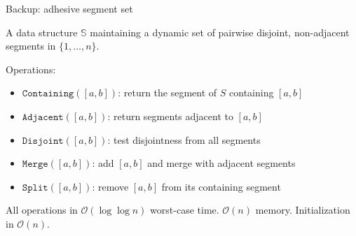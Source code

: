 \documentclass[aspectratio=169,11pt]{beamer}
\newcommand{\Oh}{\mathcal{O}}
\begin{document}

\appendix

\begin{frame}{Backup: adhesive segment set}

{\small A data structure $\mathbb{S}$ maintaining a dynamic set of pairwise disjoint, non-adjacent segments in $\{1,\ldots,n\}$.}

\medskip
Operations:
\begin{itemize}
\item $\mathtt{Containing}([a,b])$: return the segment of $S$ containing $[a,b]$
\item $\mathtt{Adjacent}([a,b])$: return segments adjacent to $[a,b]$
\item $\mathtt{Disjoint}([a,b])$: test disjointness from all segments
\item $\mathtt{Merge}([a,b])$: add $[a,b]$ and merge with adjacent segments
\item $\mathtt{Split}([a,b])$: remove $[a,b]$ from its containing segment
\end{itemize}

\medskip
{\small All operations in $\Oh(\log\log n)$ worst-case time. \quad $\Oh(n)$ memory. \quad Initialization in $\Oh(n)$.}

\bigskip
\centering
{}
\end{frame}
\end{document}
